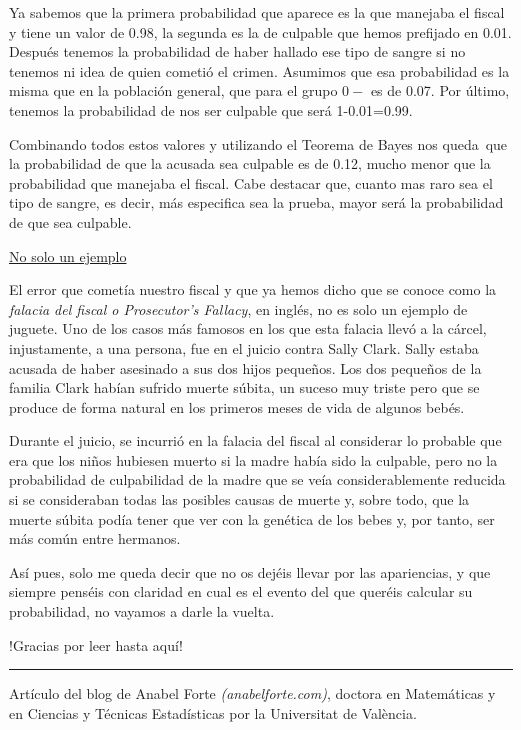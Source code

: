 \begin{myexampleblock}
\begin{small}
\vspace{2mm} Ya sabemos que la primera probabilidad que aparece es la que manejaba el fiscal y tiene un valor de 0.98, la segunda es la de culpable que hemos prefijado en 0.01. Después tenemos la probabilidad de haber hallado ese tipo de sangre si no tenemos ni idea de quien cometió el crimen. Asumimos que esa probabilidad es la misma que en la población general, que para el grupo $0-$ es de 0.07. Por último, tenemos la probabilidad de nos ser culpable que será 1-0.01=0.99.

\vspace{2mm} Combinando todos estos valores y utilizando el Teorema de Bayes nos queda que la probabilidad de que la acusada sea culpable es de 0.12, mucho menor que la probabilidad que manejaba el fiscal. Cabe destacar que, cuanto mas raro sea el tipo de sangre, es decir, más especifica sea la prueba, mayor será la probabilidad de que sea culpable.


\vspace{2mm} \underline{No solo un ejemplo}

\vspace{2mm} El error que cometía nuestro fiscal y que ya hemos dicho que se conoce como la \emph{falacia del fiscal o Prosecutor’s Fallacy}, en inglés, no es solo un ejemplo de juguete. Uno de los casos más famosos en los que esta falacia llevó a la cárcel, injustamente, a una persona, fue en el juicio contra Sally Clark. Sally estaba acusada de haber asesinado a sus dos hijos pequeños. Los dos pequeños de la familia Clark habían sufrido muerte súbita, un suceso muy triste pero que se produce de forma natural en los primeros meses de vida de algunos bebés.



\vspace{2mm} Durante el juicio, se incurrió en la falacia del fiscal al considerar lo probable que era que los niños hubiesen muerto si la madre había sido la culpable, pero no la probabilidad de culpabilidad de la madre que se veía considerablemente reducida si se consideraban todas las posibles causas de muerte y, sobre todo, que la muerte súbita podía tener que ver con la genética de los bebes y, por tanto, ser más común entre hermanos.



\vspace{2mm} Así pues, solo me queda decir que no os dejéis llevar por las apariencias, y que siempre penséis con claridad en cual es el evento del que queréis calcular su probabilidad, no vayamos a darle la vuelta.


\vspace{2mm} !Gracias por leer hasta aquí!

\rule{50mm}{0.1mm}

Artículo del blog de Anabel Forte \emph{(anabelforte.com)}, doctora en Matemáticas y en Ciencias y Técnicas Estadísticas por la Universitat de València. 

\end{small}
	
\end{myexampleblock}



